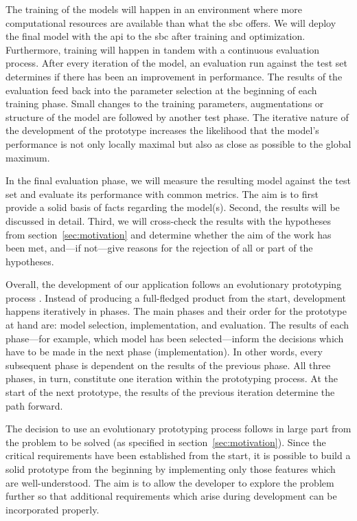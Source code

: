 \documentclass[final]{vutinfth} %
\begin{document}
The training of the models will happen in an environment where more
computational resources are available than what the \gls{sbc}
offers. We will deploy the final model with the \gls{api} to the
\gls{sbc} after training and optimization. Furthermore, training will
happen in tandem with a continuous evaluation process. After every
iteration of the model, an evaluation run against the test set
determines if there has been an improvement in performance. The
results of the evaluation feed back into the parameter selection at
the beginning of each training phase. Small changes to the training
parameters, augmentations or structure of the model are followed by
another test phase. The iterative nature of the development of the
prototype increases the likelihood that the model's performance is not
only locally maximal but also as close as possible to the global
maximum.

In the final evaluation phase, we will measure the resulting model
against the test set and evaluate its performance with common
metrics. The aim is to first provide a solid basis of facts regarding
the model(s). Second, the results will be discussed in detail. Third,
we will cross-check the results with the hypotheses from
section~\ref{sec:motivation} and determine whether the aim of the work
has been met, and—if not—give reasons for the rejection of all or part
of the hypotheses.

Overall, the development of our application follows an evolutionary
prototyping process \cite{davis1992,sears2007}. Instead of producing a
full-fledged product from the start, development happens iteratively
in phases. The main phases and their order for the prototype at hand
are: model selection, implementation, and evaluation. The results of
each phase—for example, which model has been selected—inform the
decisions which have to be made in the next phase (implementation). In
other words, every subsequent phase is dependent on the results of the
previous phase. All three phases, in turn, constitute one iteration
within the prototyping process. At the start of the next prototype,
the results of the previous iteration determine the path forward.

The decision to use an evolutionary prototyping process follows in
large part from the problem to be solved (as specified in
section~\ref{sec:motivation}). Since the critical requirements have
been established from the start, it is possible to build a solid
prototype from the beginning by implementing only those features which
are well-understood. The aim is to allow the developer to explore the
problem further so that additional requirements which arise during
development can be incorporated properly.
\end{document}
